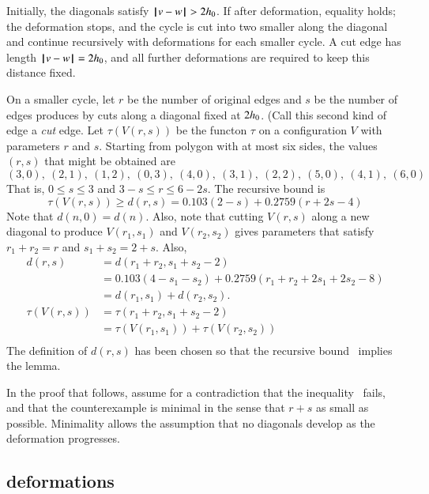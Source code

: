 Initially, the diagonals satisfy ${\hskip0.1em|\hskip-0.15em|\hskip0.1em}v - w{\hskip0.1em|\hskip-0.15em|\hskip0.1em}>2{h_0}$.
If after deformation, equality holds;  the deformation stops, and the cycle is cut into two smaller along the diagonal
and continue recursively with deformations for each smaller cycle.  A cut edge has length ${\hskip0.1em|\hskip-0.15em|\hskip0.1em}v - w{\hskip0.1em|\hskip-0.15em|\hskip0.1em}=2{h_0}$, and
 all further deformations are required to keep this distance fixed.  

On a smaller cycle, let $r$ be the number of original edges and $s$ be the number of edges produces by cuts along a diagonal fixed at $2{h_0}$.  (Call this second kind of edge a {\it cut} edge.  Let $\tau(V(r,s))$ be the functon $\tau$ on a configuration $V$ with parameters $r$ and $s$.  Starting from polygon with at most six sides, the values $(r,s)$ that might be obtained are
$$
(3,0),~(2,1),~(1,2),~(0,3),~
(4,0),~(3,1),~(2,2),~
(5,0),~(4,1),~
(6,0)
$$
That is, $0\le s\le 3$ and $3-s\le r\le 6-2s$.
The recursive bound is
\begin{equation}\label{eqn:drs}
\tau(V(r,s)) \ge d(r,s) = 0.103 (2-s) + 0.2759 (r+2s-4) 
\end{equation}
Note that $d(n,0) = d(n)$. Also, note that cutting
$V(r,s)$ along a new diagonal to produce $V(r_1,s_1)$
and $V(r_2,s_2)$ gives parameters that satisfy $r_1+r_2=r$ and $s_1+s_2 = 2+s$.
Also,
\begin{equation}\label{eqn:drs-add}
\begin{array}{lll}
d(r,s) &= d(r_1+r_2,s_1+s_2-2) \\
  &=0.103 (4-s_1-s_2) + 0.2759 (r_1+r_2+2s_1+2s_2-8) \\
  &=d(r_1,s_1) + d(r_2,s_2).\\
\tau(V(r,s)) &= \tau(r_1+r_2,s_1+s_2-2)\\
  &=\tau(V(r_1,s_1)) +\tau(V(r_2,s_2))\\
\end{array}
\end{equation}
The definition of $d(r,s)$ has been
chosen so that the recursive 
bound~ implies the
lemma.

In the proof that follows,  assume for a contradiction that the
inequality~ fails, and that the counterexample is minimal in the sense that $r+s$ as small as possible.   Minimality allows the assumption that no diagonals develop as the deformation progresses.

\subsection{deformations}

